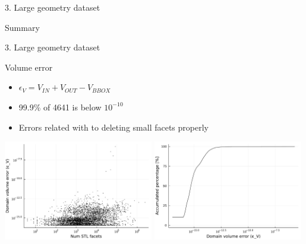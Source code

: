 \documentclass{beamer}
\begin{document}
\begin{frame}{3. Large geometry dataset}
  \begin{block}{Summary}

  \end{block}

\end{frame}


\begin{frame}{3. Large geometry dataset}



  \begin{block}{Volume error}
  \begin{itemize}
    \item
      $\epsilon_V = V_{IN} + V_{OUT} - V_{BBOX}$
    \item
      99.9\% of 4641 is below $10^{-10}$
    \item
      Errors related with to deleting small facets properly
  \end{itemize}
  \end{block}

  \includegraphics[width=0.49\textwidth]{../analysis/plots/num_stl_facets_volume_error}
  \includegraphics[width=0.49\textwidth]{../analysis/plots/histogram_volume_error}
\end{frame}
\end{document}
